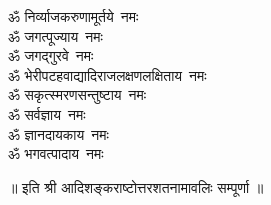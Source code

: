 \begin{multicols}{2}
\begin{flushleft}
        ॐ निर्व्याजकरुणामूर्तये~नमः\\
        ॐ जगत्पूज्याय~नमः\\
        ॐ जगद्गुरवे~नमः\\
        ॐ भेरी\-पटह\-वाद्यादि\-राजलक्षण\-लक्षिताय~नमः\\
        ॐ सकृत्स्मरणसन्तुष्टाय~नमः\\
        ॐ सर्वज्ञाय~नमः\\
        ॐ ज्ञानदायकाय~नमः\\
        ॐ भगवत्पादाय~नमः\hfill{}\\
                                                                                
    \end{flushleft}
\end{multicols}
\centerline{॥ इति श्री आदिशङ्कराष्टोत्तरशतनामावलिः  सम्पूर्णा ॥}
